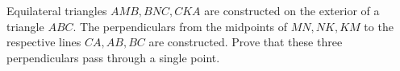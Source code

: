 Equilateral triangles $AMB,BNC,CKA$ are constructed on the exterior of a triangle $ABC$. The perpendiculars from the midpoints of $MN, NK, KM$ to the respective lines $CA, AB, BC$ are constructed. Prove that these three perpendiculars pass through a single point.
